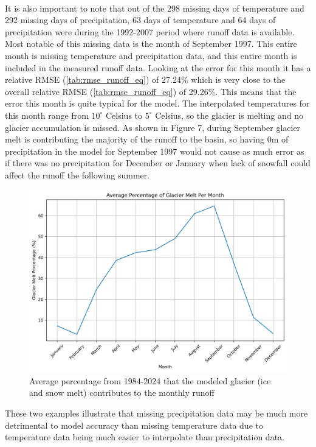 \documentclass{article}
\begin{document}
\paragraph{}
It is also important to note that out of the 298 missing days of temperature and 292 missing days of precipitation, 63 days of temperature and 64 
days of precipitation were during the 1992-2007 period where runoff data is available. Most notable of this missing data is the month of September 
1997. This entire month is missing temperature and precipitation data, and this entire month is included in the measured runoff data. Looking at the 
error for this month it has a relative RMSE (\ref{tab:rmse_runoff_eq}) of 27.24\% which is very close to the overall relative RMSE (\ref{tab:rmse_runoff_eq}) of 29.26\%. This 
means that the error this month is quite typical for the model. The interpolated temperatures for this month range from $10^\circ$ Celsius to $5^\circ$ Celsius, 
so the glacier is melting and no glacier accumulation is missed. As shown in Figure 7, during September glacier melt is 
contributing the majority of the runoff to the basin, so having 0m of precipitation in the model for September 1997 would not cause as much error as 
if there was no precipitation for December or January when lack of snowfall could affect the runoff the following summer.
\begin{figure}[h!]
    \centering
    \includegraphics[width=\textwidth]{Plots/percent_glac_melt_month.png}
    \caption{Average percentage from 1984-2024 that the modeled glacier (ice and snow melt) contributes to the monthly runoff}
    \label{fig:percent_glacier_runoff}
\end{figure}
\FloatBarrier
These two examples illustrate that missing precipitation data may be much more detrimental to model accuracy than missing temperature data 
due to temperature data being much easier to interpolate than precipitation data.
\end{document}
